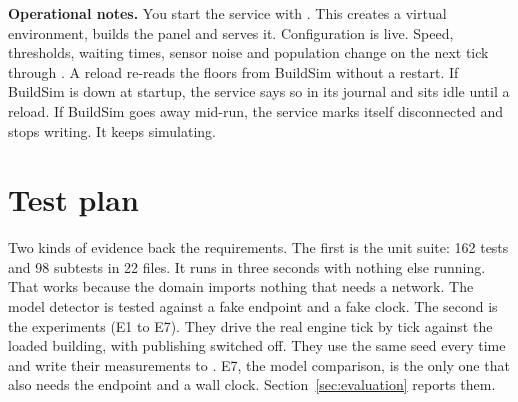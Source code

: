 \textbf{Operational notes.} You start the service with . This
creates a virtual environment, builds the panel and serves it. Configuration is
live. Speed, thresholds, waiting times, sensor noise and population change on the
next tick through . A reload re-reads the floors from
BuildSim without a restart. If BuildSim is down at startup, the service says so in
its journal and sits idle until a reload. If BuildSim goes away mid-run, the
service marks itself disconnected and stops writing. It keeps simulating.

\section{Test plan}\label{sec:testplan}

Two kinds of evidence back the requirements. The first is the unit suite: 162
tests and 98 subtests in 22 files. It runs in three seconds with nothing else
running. That works because the domain imports nothing that needs a network. The
model detector is tested against a fake endpoint and a fake clock. The second is
the experiments (E1 to E7). They drive the real engine tick by tick against the
loaded building, with publishing switched off. They use the same seed every time
and write their measurements to . E7, the model
comparison, is the only one that also needs the endpoint and a wall clock.
Section~\ref{sec:evaluation} reports them.

